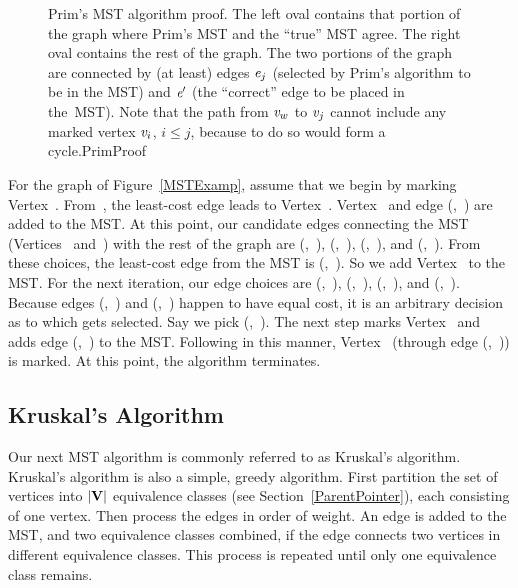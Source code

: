 \begin{figure}
\vspace{-\medskipamount}
{Prim's MST algorithm proof.
The left oval contains that portion of the graph where Prim's MST and
the ``true'' MST  agree.
The right oval contains the rest of the graph.
The two portions of the graph are connected by (at least) edges
\({\textit{e}}_j\) (selected by Prim's algorithm to be in the MST) and
\({\textit{e}}'\) (the ``correct'' edge to be placed in
the~MST).
Note that the path from \({\textit{v}}_w\) to \({\textit{v}}_{j}\) cannot
include any marked vertex \({\textit{v}}_i\), \(i \leq j\), because to do so
would form a cycle.}{PrimProof}
\medskip
\medskip
\end{figure}

\begin{example}
For the graph of Figure~\ref{MSTExamp}, assume that we begin by
marking Vertex~.
From~, the least-cost edge leads to Vertex~.
Vertex~ and edge (,~) are added to the MST.
At this point, our candidate edges connecting the MST
(Vertices~ and~) with the rest of the graph are
(,~), (,~), (,~), and
(,~).
From these choices, the least-cost edge from the MST is
(,~). 
So we add Vertex~ to the MST.
For the next iteration, our edge choices are (,~),
(,~), (,~), and (,~).
Because edges (,~) and (,~) happen to
have equal cost, it is an
arbitrary decision as to which gets selected.
Say we pick (,~).
The next step marks Vertex~ and adds edge
(,~) to the MST.
Following in this manner, Vertex~
(through edge (,~)) is marked.
At this point, the algorithm
terminates.
\end{example}

\subsection{Kruskal's Algorithm}
\label{Kruskal}

Our next MST algorithm is commonly referred to as Kruskal's
algorithm.
Kruskal's algorithm is also a simple, greedy
algorithm.
First partition the set of vertices into \(|{\textbf{V}}|\) equivalence
classes (see Section~\ref{ParentPointer}), each consisting of one
vertex.
Then process the edges in order of weight.
An edge is added to the MST, and two equivalence classes combined,
if the edge connects two vertices in different equivalence classes.
This process is repeated until only one equivalence class remains.

